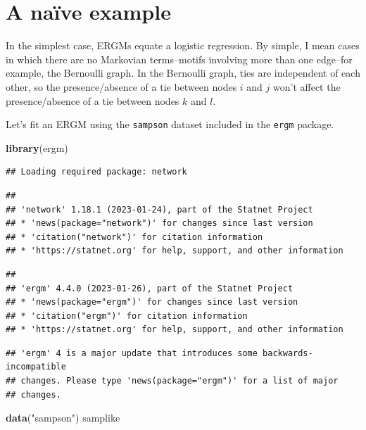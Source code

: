 \documentclass[
]{book}
\newenvironment{Shaded}{\begin{snugshade}}{\end{snugshade}}
\newcommand{\FunctionTok}[1]{\textcolor[rgb]{0.13,0.29,0.53}{\textbf{#1}}}
\newcommand{\NormalTok}[1]{#1}
\newcommand{\StringTok}[1]{\textcolor[rgb]{0.31,0.60,0.02}{#1}}
\begin{document}
\hypertarget{a-nauxefve-example}{%
\section{A naïve example}\label{a-nauxefve-example}}

In the simplest case, ERGMs equate a logistic regression. By simple, I mean cases in which there are no Markovian terms--motifs involving more than one edge--for example, the Bernoulli graph. In the Bernoulli graph, ties are independent of each other, so the presence/absence of a tie between nodes \(i\) and \(j\) won't affect the presence/absence of a tie between nodes \(k\) and \(l\).

Let's fit an ERGM using the \texttt{sampson} dataset included in the \texttt{ergm} package.

\begin{Shaded}
\begin{Highlighting}[]
\FunctionTok{library}\NormalTok{(ergm)}
\end{Highlighting}
\end{Shaded}

\begin{verbatim}
## Loading required package: network
\end{verbatim}

\begin{verbatim}
## 
## 'network' 1.18.1 (2023-01-24), part of the Statnet Project
## * 'news(package="network")' for changes since last version
## * 'citation("network")' for citation information
## * 'https://statnet.org' for help, support, and other information
\end{verbatim}

\begin{verbatim}
## 
## 'ergm' 4.4.0 (2023-01-26), part of the Statnet Project
## * 'news(package="ergm")' for changes since last version
## * 'citation("ergm")' for citation information
## * 'https://statnet.org' for help, support, and other information
\end{verbatim}

\begin{verbatim}
## 'ergm' 4 is a major update that introduces some backwards-incompatible
## changes. Please type 'news(package="ergm")' for a list of major
## changes.
\end{verbatim}

\begin{Shaded}
\begin{Highlighting}[]
\FunctionTok{data}\NormalTok{(}\StringTok{"sampson"}\NormalTok{)}
\NormalTok{samplike}
\end{Highlighting}
\end{Shaded}
\end{document}

